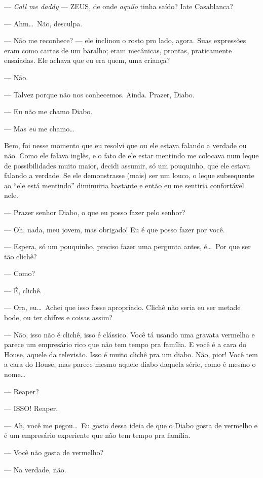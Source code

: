 --- \emph{Call me daddy} --- ZEUS, de onde \emph{aquilo} tinha saído? Iate Casablanca?

--- Ahm\ldots \ Não, desculpa.

--- Não me reconhece? --- ele inclinou o rosto pro lado, agora. Suas expressões eram como cartas de um baralho; eram mecânicas, prontas, praticamente ensaiadas. Ele achava que eu era quem, uma criança?

--- Não.

--- Talvez porque não nos conhecemos. Ainda. Prazer, Diabo.

--- Eu não me chamo Diabo.

--- Mas \emph{eu} me chamo\ldots

Bem, foi nesse momento que eu resolvi que ou ele estava falando a verdade ou não. Como ele falava inglês, e o fato de ele estar mentindo me colocava num leque de possibilidades muito maior, decidi assumir, só um pouquinho, que ele estava falando a verdade. Se ele demonstrasse (mais) ser um louco, o leque subsequente ao ``ele está mentindo'' diminuiria bastante e então eu me sentiria confortável nele.

--- Prazer senhor Diabo, o que eu posso fazer pelo senhor?

--- Oh, nada, meu jovem, mas obrigado! Eu é que posso fazer por você.

--- Espera, só um pouquinho, preciso fazer uma pergunta antes, é\ldots \ Por que ser tão clichê?

--- Como?

--- É, clichê.

--- Ora, eu\ldots \ Achei que isso fosse apropriado. Clichê não seria eu ser metade bode, ou ter chifres e coisas assim?

--- Não, isso não é clichê, isso é clássico. Você tá usando uma gravata vermelha e parece um empresário rico que não tem tempo pra família. E você é a cara do House, aquele da televisão. Isso é muito clichê pra um diabo. Não, pior! Você tem a cara do House, mas parece mesmo aquele diabo daquela série, como é mesmo o nome\ldots

--- Reaper?

--- ISSO! Reaper.

--- Ah, você me pegou\ldots \ Eu gosto dessa ideia de que o Diabo gosta de vermelho e é um empresário experiente que não tem tempo pra família.

--- Você não gosta de vermelho?

--- Na verdade, não.

